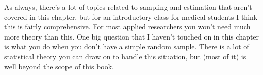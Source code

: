 \noindent
As always, there's a lot of topics related to sampling and estimation that aren't covered in this chapter, but for an introductory class for medical students I think this is fairly comprehensive. For most applied researchers you won't need much more theory than this. One big question that I haven't touched on in this chapter is what you do when you don't have a simple random sample. There is a lot of statistical theory you can draw on to handle this situation, but (most of it) is well beyond the scope of this book.